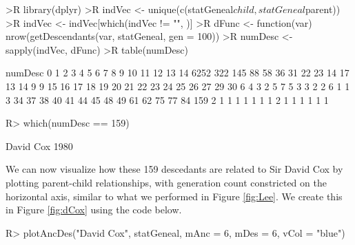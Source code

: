 \documentclass[article,shortnames]{jss}
\begin{document}
\begin{CodeChunk}
\begin{CodeInput}
>R library(dplyr)
>R indVec <- unique(c(statGeneal$child, statGeneal$parent))
>R indVec <- indVec[which(indVec != "", )]
>R dFunc <- function(var) nrow(getDescendants(var, statGeneal, gen = 100))
>R numDesc <- sapply(indVec, dFunc)
>R table(numDesc)
\end{CodeInput}
\begin{CodeOutput}
numDesc
   0    1    2    3    4    5    6    7    8    9   10   11   12   13   14 
6252  322  145   88   58   36   31   22   23   14   17   13   14    9    9 
  15   16   17   18   19   20   21   22   23   24   25   26   27   29   30 
   6    4    3    2    5    7    5    3    3    2    2    6    1    1    3 
  34   37   38   40   41   44   45   48   49   61   62   75   77   84  159 
   2    1    1    1    1    1    1    1    2    1    1    1    1    1    1
\end{CodeOutput}
\begin{CodeInput}
R> which(numDesc == 159)
\end{CodeInput}
\begin{CodeOutput}
David Cox 
     1980
\end{CodeOutput}
\end{CodeChunk}

We can now visualize how these 159 descedants are related to Sir David Cox by plotting parent-child relationships, with generation count constricted on the horizontal axis, similar to what we performed in Figure \ref{fig:Lee}. We create this in Figure \ref{fig:dCox} using the code below.

\begin{CodeInput}
R> plotAncDes("David Cox", statGeneal, mAnc = 6, mDes = 6, vCol = "blue")
\end{CodeInput}
\end{document}
